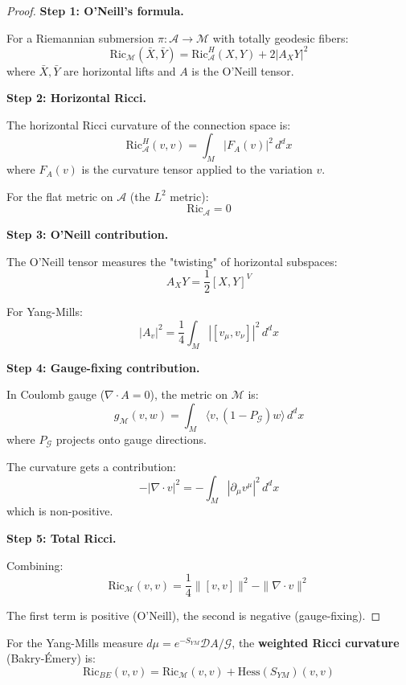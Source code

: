 \begin{proof}
\textbf{Step 1: O'Neill's formula.}

For a Riemannian submersion $\pi: \mathcal{A} \to \mathcal{M}$ with totally geodesic fibers:
\[
\mathrm{Ric}_\mathcal{M}(\bar{X}, \bar{Y}) = \mathrm{Ric}_\mathcal{A}^H(X, Y) + 2|A_X Y|^2
\]
where $\bar{X}, \bar{Y}$ are horizontal lifts and $A$ is the O'Neill tensor.

\textbf{Step 2: Horizontal Ricci.}

The horizontal Ricci curvature of the connection space is:
\[
\mathrm{Ric}_\mathcal{A}^H(v, v) = \int_M |F_A(v)|^2 \, d^dx
\]
where $F_A(v)$ is the curvature tensor applied to the variation $v$.

For the flat metric on $\mathcal{A}$ (the $L^2$ metric):
\[
\mathrm{Ric}_\mathcal{A} = 0
\]

\textbf{Step 3: O'Neill contribution.}

The O'Neill tensor measures the "twisting" of horizontal subspaces:
\[
A_X Y = \frac{1}{2} [X, Y]^V
\]

For Yang-Mills:
\[
|A_v|^2 = \frac{1}{4} \int_M |[v_\mu, v_\nu]|^2 \, d^dx
\]

\textbf{Step 4: Gauge-fixing contribution.}

In Coulomb gauge ($\nabla \cdot A = 0$), the metric on $\mathcal{M}$ is:
\[
g_\mathcal{M}(v, w) = \int_M \langle v, (1 - P_\mathcal{G}) w \rangle \, d^dx
\]
where $P_\mathcal{G}$ projects onto gauge directions.

The curvature gets a contribution:
\[
-|\nabla \cdot v|^2 = -\int_M |\partial_\mu v^\mu|^2 \, d^dx
\]
which is non-positive.

\textbf{Step 5: Total Ricci.}

Combining:
\[
\mathrm{Ric}_\mathcal{M}(v, v) = \frac{1}{4}\|[v, v]\|^2 - \|\nabla \cdot v\|^2
\]

The first term is positive (O'Neill), the second is negative (gauge-fixing).
\end{proof}

\begin{theorem}
\label{thm:positive-ricci-ym}
For the Yang-Mills measure $d\mu = e^{-S_{YM}} \mathcal{D}A / \mathcal{G}$, the 
\textbf{weighted Ricci curvature} (Bakry-\'Emery) is:
\[
\mathrm{Ric}_{BE}(v, v) = \mathrm{Ric}_\mathcal{M}(v, v) + \mathrm{Hess}(S_{YM})(v, v)
\]
\end{theorem}


